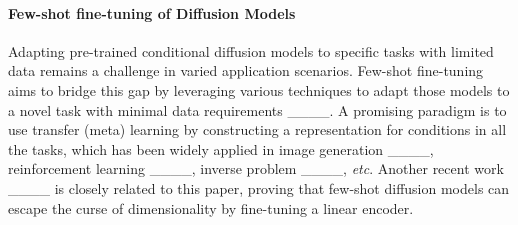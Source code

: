 \paragraph{Few-shot fine-tuning of Diffusion Models}

Adapting pre-trained conditional diffusion models to specific tasks with limited data remains a challenge in varied application scenarios.
Few-shot fine-tuning aims to bridge this gap by leveraging various techniques to adapt those models to a novel task with minimal data requirements ____.
A promising paradigm is to use transfer (meta) learning by constructing a representation for conditions in all the tasks, which has been widely applied in image generation ____, reinforcement learning ____, inverse problem ____, \textit{etc}.
Another recent work ____ is closely related to this paper, proving that few-shot diffusion models can escape the curse of dimensionality by fine-tuning a linear encoder.